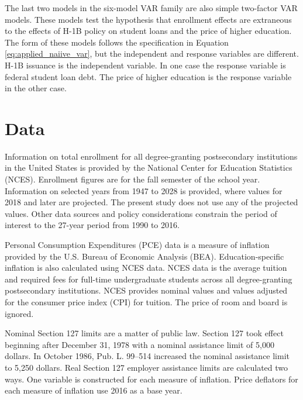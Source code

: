 \documentclass[review]{elsarticle}
\begin{document}
The last two models in the six-model VAR family are also simple two-factor VAR models.
These models test the hypothesis that enrollment effects are extraneous
to the effects of H-1B policy on student loans and the price of higher education.
The form of these models follows the specification in Equation \ref{eq:applied_naiive_var},
but the independent and response variables are different.
H-1B issuance is the independent variable.
In one case the response variable is federal student loan debt.
The price of higher education is the response variable in the other case.

\section{Data}

Information on total enrollment for all degree-granting postsecondary institutions in the United States
is provided by the National Center for Education Statistics (NCES)\cite{nces_2019}.
Enrollment figures are for the fall semester of the school year.
Information on selected years from 1947 to 2028 is provided, where values for 2018 and later are projected.
The present study does not use any of the projected values.
Other data sources and policy considerations constrain the period of interest to the 27-year period from 1990 to 2016.

Personal Consumption Expenditures (PCE) data is a measure of inflation provided by the U.S. Bureau of Economic Analysis (BEA)\cite{bea_2020}.
Education-specific inflation is also calculated using NCES data\cite{nces_2017}.
NCES data is the average tuition and required fees for full-time undergraduate students across all degree-granting postsecondary institutions.
NCES provides nominal values and values adjusted for the consumer price index (CPI) for tuition.
The price of room and board is ignored.

Nominal Section 127 limits are a matter of public law.
Section 127 took effect beginning after December 31, 1978 with a nominal assistance limit of 5,000 dollars\cite{plaw95_600_1978}.
In October 1986, Pub. L. 99–514 increased the nominal assistance limit to 5,250 dollars\cite{plaw99_514_1986}.
Real Section 127 employer assistance limits are calculated two ways.
One variable is constructed for each measure of inflation.
Price deflators for each measure of inflation use 2016 as a base year.
\end{document}
